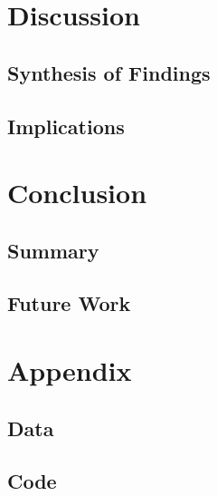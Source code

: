 \documentclass[a4paper, english]{article}
\begin{document}
\section{Discussion}
    \subsection{Synthesis of Findings}
    \subsection{Implications}

\section{Conclusion}
    \subsection{Summary}
    \subsection{Future Work}

\section{Appendix}
    \subsection{Data}
    \subsection{Code}


\newpage
\printbibliography
\end{document}
